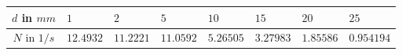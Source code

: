 \begin{tabular}{c|*{7}{*{1}{l}}}
$d$ in ${\si{mm}}$ & $1$ & $2$ & $5$ & $10$ & $15$ & $20$ & $25$ \\ \hline
$N$ in ${\si{1/s}}$ & $12.4932$ & $11.2221$ & $11.0592$ & $5.26505$ & $3.27983$ & $1.85586$ & $0.954194$\end{tabular}
